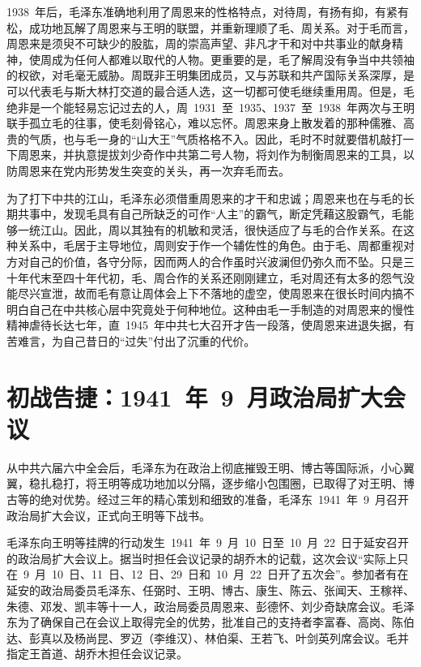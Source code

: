 1938~年后，毛泽东准确地利用了周恩来的性格特点，对待周，有扬有抑，有紧有松，成功地瓦解了周恩来与王明的联盟，并重新理顺了毛、周关系。对于毛而言，周恩来是须臾不可缺少的股肱，周的崇高声望、非凡才干和对中共事业的献身精神，使周成为任何人都难以取代的人物。更重要的是，毛了解周没有争当中共领袖的权欲，对毛毫无威胁。周既非王明集团成员，又与苏联和共产国际关系深厚，是可以代表毛与斯大林打交道的最合适人选，这一切都可使毛继续重用周。但是，毛绝非是一个能轻易忘记过去的人，周~1931~至~1935、1937~至~1938~年两次与王明联手孤立毛的往事，使毛刻骨铭心，难以忘怀。周恩来身上散发着的那种儒雅、高贵的气质，也与毛一身的“山大王”气质格格不入。因此，毛时不时就要借机敲打一下周恩来，并执意提拔刘少奇作中共第二号人物，将刘作为制衡周恩来的工具，以防周恩来在党内形势发生突变的关头，再一次弃毛而去。

为了打下中共的江山，毛泽东必须借重周恩来的才干和忠诚；周恩来也在与毛的长期共事中，发现毛具有自己所缺乏的可作“人主”的霸气，断定凭藉这股霸气，毛能够一统江山。因此，周以其独有的机敏和灵活，很快适应了与毛的合作关系。在这种关系中，毛居于主导地位，周则安于作一个辅佐性的角色。由于毛、周都重视对方对自己的价值，各守分际，因而两人的合作虽时兴波澜但仍弥久而不坠。只是三十年代末至四十年代初，毛、周合作的关系还刚刚建立，毛对周还有太多的怨气没能尽兴宣泄，故而毛有意让周体会上下不落地的虚空，使周恩来在很长时间内搞不明白自己在中共核心层中究竟处于何种地位。这种由毛一手制造的对周恩来的慢性精神虐待长达七年，直~1945~年中共七大召开才告一段落，使周恩来进退失据，有苦难言，为自己昔日的“过失”付出了沉重的代价。

\section{初战告捷：1941~年~9~月政治局扩大会议}

从中共六届六中全会后，毛泽东为在政治上彻底摧毁王明、博古等国际派，小心翼翼，稳扎稳打，将王明等成功地加以分隔，逐步缩小包围圈，已取得了对王明、博古等的绝对优势。经过三年的精心策划和细致的准备，毛泽东~1941~年~9~月召开政治局扩大会议，正式向王明等下战书。

毛泽东向王明等挂牌的行动发生~1941~年~9~月~10~日至~10~月~22~日于延安召开的政治局扩大会议上。据当时担任会议记录的胡乔木的记载，这次会议“实际上只在~9~月~10~日、11~日、12~日、29~日和~10~月~22~日开了五次会”。参加者有在延安的政治局委员毛泽东、任弼时、王明、博古、康生、陈云、张闻天、王稼祥、朱德、邓发、凯丰等十一人，政治局委员周恩来、彭德怀、刘少奇缺席会议。毛泽东为了确保自己在会议上取得完全的优势，批准自己的支持者李富春、高岗、陈伯达、彭真以及杨尚昆、罗迈（李维汉）、林伯渠、王若飞、叶剑英列席会议。毛并指定王首道、胡乔木担任会议记录。

